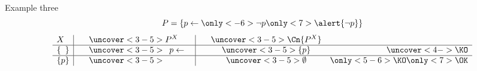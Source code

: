 \begin{frame}{Example three}
\[
P
=
\left\{
    p \leftarrow \only<-6>{\neg p}\only<7>{\alert{\neg p}}
\right\}
\]
\pause\bigskip
\newcommand{\PIip}{%
    \begin{array}[t]{l}
    \end{array}}
\newcommand{\PIop}{%
    \begin{array}[t]{l}
      p \leftarrow \
    \end{array}}
\[
\begin{array}{l|cl|ccr}
             X  &\ &\uncover<3-5>{P^X}&\ &\uncover<3-5>{\Cn{P^X}} &                  \\\hline
\{\phantom{p}\} &  &\uncover<3-5>{\PIop}&  &\uncover<3-5>{\{p\}}      &\uncover<4->{\KO} \\\hline
\{         p \} &  &\uncover<3-5>{\PIip}&  &\uncover<3-5>{\emptyset}  &  \only<5-6>{\KO}\only<7>{\OK}
\end{array}
\]
\bigskip
\end{frame}
%
